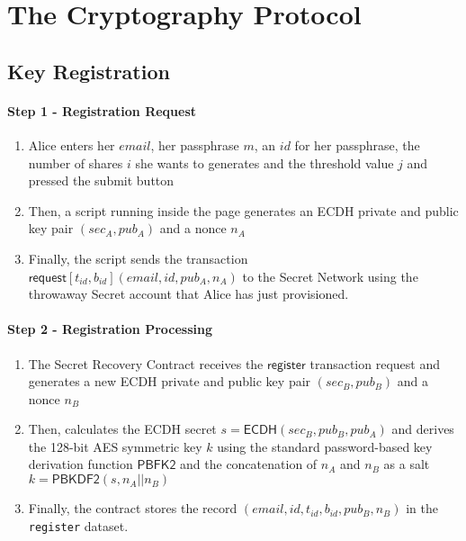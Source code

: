 \documentclass[12pt]{article}
\newcommand{\ms}[1]{\ensuremath{\mathsf{#1}}}
\newcommand{\tx}[3]{\ms{#1}[#2](#3)}
\begin{document}
\section{The Cryptography Protocol}

\subsection{Key Registration}

\paragraph{Step 1 - Registration Request}

\begin{enumerate}[label=1.\arabic*]
  \item Alice enters her $email$, her passphrase $m$, an $id$ for her passphrase, the number of shares $i$ she wants to generates and the threshold value $j$ and pressed the submit button
  \item Then, a script running inside the page generates an ECDH private and public key pair $(sec_A, pub_A)$ and a nonce $n_A$
  \item Finally, the script sends the transaction $\tx{request}{t_{id}, b_{id}}{email, id, pub_A, n_A}$ to the Secret Network using the throwaway Secret account that Alice has just provisioned.
\end{enumerate}

\paragraph{Step 2 - Registration Processing}

\begin{enumerate}[label=2.\arabic*]
  \item The Secret Recovery Contract receives the $\ms{register}$ transaction request and generates a new ECDH private and public key pair $(sec_B, pub_B)$ and a nonce $n_B$
  \item Then, calculates the ECDH secret $s=\ms{ECDH}(sec_B, pub_B, pub_A)$ and derives the 128-bit AES symmetric key $k$ using the standard password-based key derivation function $\ms{PBFK2}$ and the concatenation of $n_A$ and $n_B$ as a salt $k=\ms{PBKDF2}(s, n_A || n_B)$
  \item Finally, the contract stores the record $(email, id, t_{id}, b_{id}, pub_B, n_B)$ in the {\tt register} dataset. 
\end{enumerate}
\end{document}
